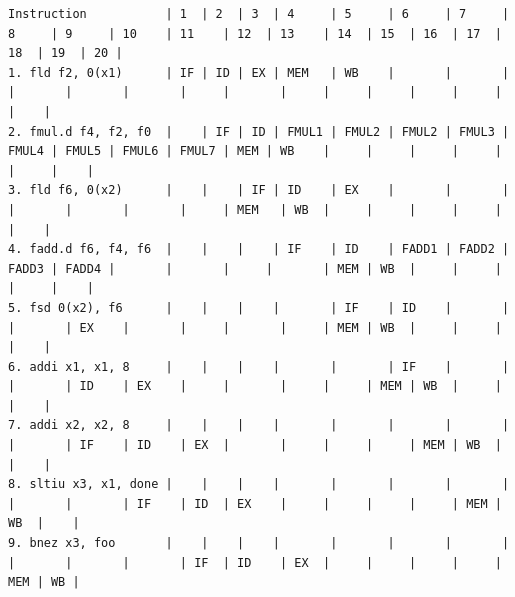 \documentclass[11pt]{article}
\begin{document}

%
%
%
%
%
%

\begin{verbatim}
Instruction           | 1  | 2  | 3  | 4     | 5     | 6     | 7     | 8     | 9     | 10    | 11    | 12  | 13    | 14  | 15  | 16  | 17  | 18  | 19  | 20 |
1. fld f2, 0(x1)      | IF | ID | EX | MEM   | WB    |       |       |       |       |       |       |     |       |     |     |     |     |     |     |    |
2. fmul.d f4, f2, f0  |    | IF | ID | FMUL1 | FMUL2 | FMUL2 | FMUL3 | FMUL4 | FMUL5 | FMUL6 | FMUL7 | MEM | WB    |     |     |     |     |     |     |    |
3. fld f6, 0(x2)      |    |    | IF | ID    | EX    |       |       |       |       |       |       |     | MEM   | WB  |     |     |     |     |     |    |
4. fadd.d f6, f4, f6  |    |    |    | IF    | ID    | FADD1 | FADD2 | FADD3 | FADD4 |       |       |     |       | MEM | WB  |     |     |     |     |    |
5. fsd 0(x2), f6      |    |    |    |       | IF    | ID    |       |       |       | EX    |       |     |       |     | MEM | WB  |     |     |     |    |
6. addi x1, x1, 8     |    |    |    |       |       | IF    |       |       |       | ID    | EX    |     |       |     |     | MEM | WB  |     |     |    |
7. addi x2, x2, 8     |    |    |    |       |       |       |       |       |       | IF    | ID    | EX  |       |     |     |     | MEM | WB  |     |    |
8. sltiu x3, x1, done |    |    |    |       |       |       |       |       |       |       | IF    | ID  | EX    |     |     |     |     | MEM | WB  |    |
9. bnez x3, foo       |    |    |    |       |       |       |       |       |       |       |       | IF  | ID    | EX  |     |     |     |     | MEM | WB |
\end{verbatim}

\newpage
\end{document}
